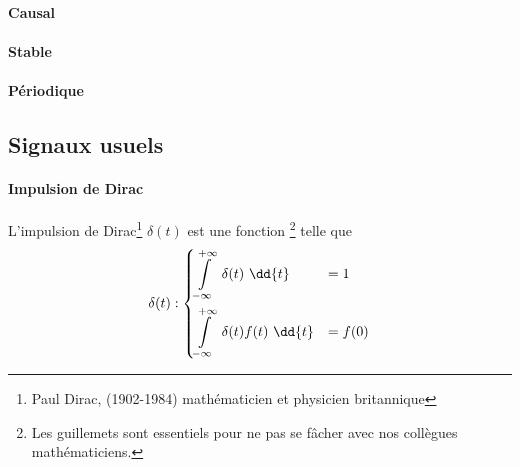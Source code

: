 \paragraph{Causal}

\begin{center}

\end{center}


\paragraph{Stable}

\begin{center}

\end{center}                

\begin{center}

\end{center}

\begin{center}

\end{center}

\paragraph{Périodique}
\begin{center}

\end{center}

\subsection{Signaux usuels}
\paragraph{Impulsion de Dirac}

L'impulsion de Dirac\footnote{Paul Dirac, (1902-1984) mathématicien et 
physicien britannique} $\delta(t)$ est une \og fonction\fg 
\footnote{Les guillemets sont essentiels pour ne pas se fâcher avec nos collègues mathématiciens.} telle que
\begin{align*}
\delta(t) : 
\begin{dcases}
	\int\limits_{-\infty}^{+\infty}	 \delta(t)\,\,\dd{t}&=1   \\
\int\limits_{-\infty}^{+\infty}  \delta(t)f(t)\,\,\dd{t}&=f(0)	
\end{dcases}
\end{align*}


